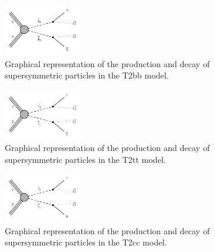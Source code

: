 \begin{figure}[h!] \begin{center}
    \includegraphics[width=0.3\textwidth]{Supplementary/CMS-SUS-16-038_Figure-aux_005}
        \caption{
            Graphical representation of the production and decay of
            supersymmetric particles in the T2bb model.
        }
        \label{fig:simplified-models-feyn-T2bb}
\end{center} \end{figure}

\begin{figure}[h!] \begin{center}
    \includegraphics[width=0.3\textwidth]{Supplementary/CMS-SUS-16-038_Figure-aux_006}
        \caption{
            Graphical representation of the production and decay of
            supersymmetric particles in the T2tt model.
        }
        \label{fig:simplified-models-feyn-T2tt}
\end{center} \end{figure}

\begin{figure}[h!] \begin{center}
    \includegraphics[width=0.3\textwidth]{Supplementary/CMS-SUS-16-038_Figure-aux_007}
        \caption{
            Graphical representation of the production and decay of
            supersymmetric particles in the T2cc model.
        }
        \label{fig:simplified-models-feyn-T2cc}
\end{center} \end{figure}

